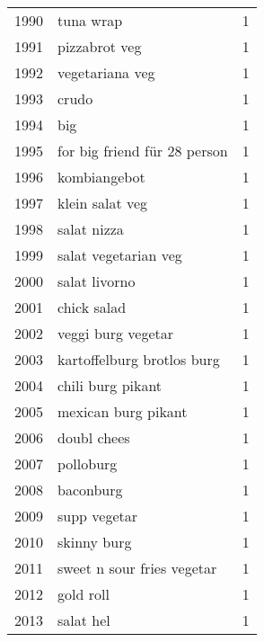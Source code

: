 \begin{tabular}{llr}
1990 &                                          tuna wrap &      1 \\
1991 &                                      pizzabrot veg &      1 \\
1992 &                                    vegetariana veg &      1 \\
1993 &                                              crudo &      1 \\
1994 &                                                big &      1 \\
1995 &                      for big friend für 28 person &      1 \\
1996 &                                       kombiangebot &      1 \\
1997 &                                    klein salat veg &      1 \\
1998 &                                        salat nizza &      1 \\
1999 &                               salat vegetarian veg &      1 \\
2000 &                                      salat livorno &      1 \\
2001 &                                        chick salad &      1 \\
2002 &                                 veggi burg vegetar &      1 \\
2003 &                         kartoffelburg brotlos burg &      1 \\
2004 &                                  chili burg pikant &      1 \\
2005 &                                mexican burg pikant &      1 \\
2006 &                                        doubl chees &      1 \\
2007 &                                          polloburg &      1 \\
2008 &                                          baconburg &      1 \\
2009 &                                       supp vegetar &      1 \\
2010 &                                        skinny burg &      1 \\
2011 &                         sweet n sour fries vegetar &      1 \\
2012 &                                          gold roll &      1 \\
2013 &                                          salat hel &      1 \\

\end{tabular}

